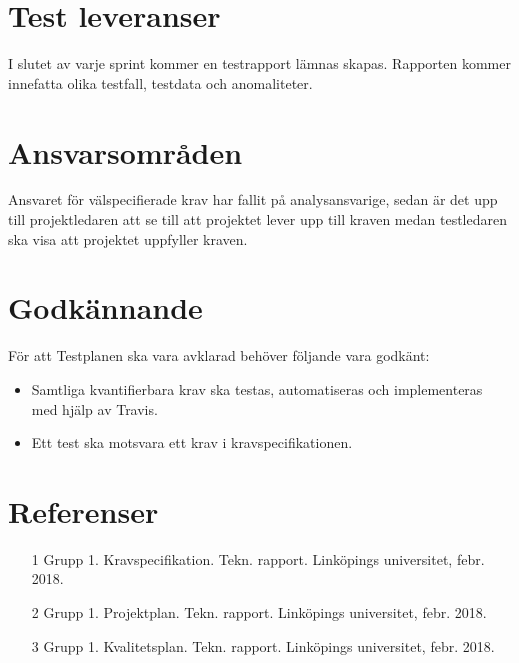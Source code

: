 \documentclass[10pt]{article}
\begin{document}
\section{Test leveranser}
	I slutet av varje sprint kommer en testrapport lämnas skapas. Rapporten kommer innefatta olika testfall, testdata och anomaliteter.




\section{Ansvarsområden}
	Ansvaret för välspecifierade krav har fallit på analysansvarige, sedan är det upp till projektledaren att se till att projektet lever upp till kraven medan testledaren ska visa att projektet uppfyller kraven.

  

	
	
\section{Godkännande}
	För att Testplanen ska vara avklarad behöver följande vara godkänt:
	\begin{itemize}
	 \item Samtliga kvantifierbara krav ska testas, automatiseras och implementeras med hjälp av Travis.
	 \item Ett test ska motsvara ett krav i kravspecifikationen.
	\end{itemize}
	


\section{Referenser}
	\begin{itemize}
	\item [1] Grupp 1. Kravspecifikation. Tekn. rapport. Linköpings universitet, febr. 2018.
	\item [2] Grupp 1. Projektplan. Tekn. rapport. Linköpings universitet, febr. 2018.
	\item [3] Grupp 1. Kvalitetsplan. Tekn. rapport. Linköpings universitet, febr. 2018.
	\end{itemize}
\end{document}
